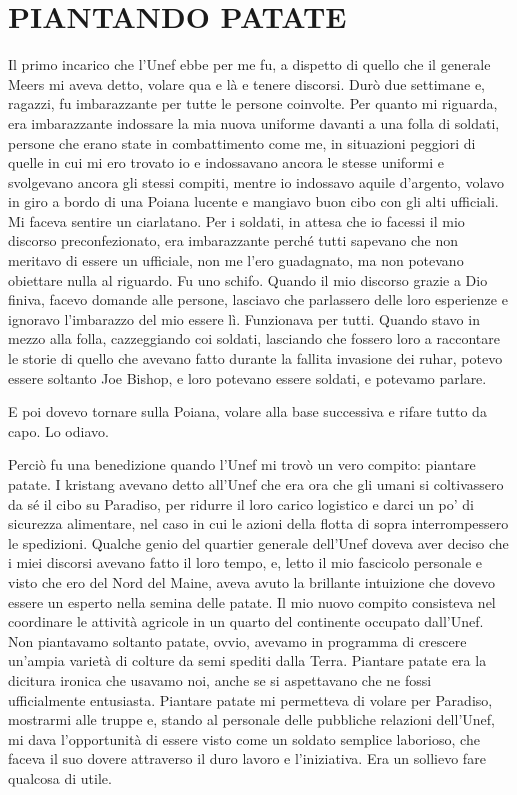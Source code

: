 \chapter{PIANTANDO PATATE}\label{piantando-patate}

\hfill\break

Il primo incarico che l'Unef ebbe per me fu, a dispetto di quello che il
generale Meers mi aveva detto, volare qua e là e tenere discorsi. Durò
due settimane e, ragazzi, fu imbarazzante per tutte le persone
coinvolte. Per quanto mi riguarda, era imbarazzante indossare la mia
nuova uniforme davanti a una folla di soldati, persone che erano state
in combattimento come me, in situazioni peggiori di quelle in cui mi ero
trovato io e indossavano ancora le stesse uniformi e svolgevano ancora
gli stessi compiti, mentre io indossavo aquile d'argento, volavo in giro
a bordo di una Poiana lucente e mangiavo buon cibo con gli alti
ufficiali. Mi faceva sentire un ciarlatano. Per i soldati, in attesa che
io facessi il mio discorso preconfezionato, era imbarazzante perché
tutti sapevano che non meritavo di essere un ufficiale, non me l'ero
guadagnato, ma non potevano obiettare nulla al riguardo. Fu uno schifo.
Quando il mio discorso grazie a Dio finiva, facevo domande alle persone,
lasciavo che parlassero delle loro esperienze e ignoravo l'imbarazzo del
mio essere lì. Funzionava per tutti. Quando stavo in mezzo alla folla,
cazzeggiando coi soldati, lasciando che fossero loro a raccontare le
storie di quello che avevano fatto durante la fallita invasione dei
ruhar, potevo essere soltanto Joe Bishop, e loro potevano essere
soldati, e potevamo parlare.

E poi dovevo tornare sulla Poiana, volare alla base successiva e rifare
tutto da capo. Lo odiavo.

Perciò fu una benedizione quando l'Unef mi trovò un vero compito:
piantare patate. I kristang avevano detto all'Unef che era ora che gli
umani si coltivassero da sé il cibo su Paradiso, per ridurre il loro
carico logistico e darci un po' di sicurezza alimentare, nel caso in cui
le azioni della flotta di sopra interrompessero le spedizioni. Qualche
genio del quartier generale dell'Unef doveva aver deciso che i miei
discorsi avevano fatto il loro tempo, e, letto il mio fascicolo
personale e visto che ero del Nord del Maine, aveva avuto la brillante
intuizione che dovevo essere un esperto nella semina delle patate. Il
mio nuovo compito consisteva nel coordinare le attività agricole in un
quarto del continente occupato dall'Unef. Non piantavamo soltanto
patate, ovvio, avevamo in programma di crescere un'ampia varietà di
colture da semi spediti dalla Terra. Piantare patate era la dicitura
ironica che usavamo noi, anche se si aspettavano che ne fossi
ufficialmente entusiasta. Piantare patate mi permetteva di volare per
Paradiso, mostrarmi alle truppe e, stando al personale delle pubbliche
relazioni dell'Unef, mi dava l'opportunità di essere visto come un
soldato semplice laborioso, che faceva il suo dovere attraverso il duro
lavoro e l'iniziativa. Era un sollievo fare qualcosa di utile.

